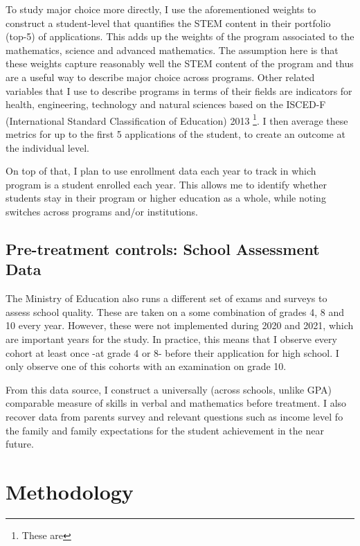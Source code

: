 \documentclass[12pt]{article}
\begin{document}
To study major choice more directly, I use the aforementioned weights to construct a student-level that quantifies the STEM content in their portfolio (top-5) of applications.  This adds up the weights of the program associated to the mathematics, science and advanced mathematics. The assumption here is that these weights capture reasonably well the STEM content of the program and thus are a useful way to describe major choice across programs. Other related variables that I use to describe programs in terms of their fields are indicators for health, engineering, technology and natural sciences based on the ISCED-F (International Standard Classification of Education) 2013 \footnote{These are }. I then average these metrics for up to the first 5 applications of the student, to create an outcome at the individual level. 

On top of that, I plan to use enrollment data each year to track in which program is a student enrolled each year. This allows me to identify whether students stay in their program or higher education as a whole, while noting switches across programs and/or institutions. 




\subsection{Pre-treatment controls: School Assessment Data}

The Ministry of Education also runs a different set of exams and surveys to assess school quality. These are taken on a some combination of grades 4, 8 and 10 every year. However, these were not implemented during 2020 and 2021, which are important years for the study. In practice, this means that I observe every cohort at least once -at grade 4 or 8- before their application for high school. I only observe one of this cohorts with an examination on grade 10. 

From this data source, I construct a universally (across schools, unlike GPA) comparable measure of skills in verbal and mathematics before treatment. I also recover data from parents survey and relevant questions such as income level fo the family and family expectations for the student achievement in the near future.



\section{Methodology}
\end{document}
